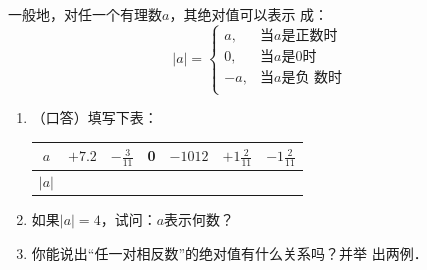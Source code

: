 一般地，对任一个有理数$a$，其绝对值可以表示
成：
\[|a|=\begin{cases}
a, & \text{当$a$是正数时}\\
0, & \text{当$a$是0时}\\
-a, & \text{当$a$是负 数时}\\
\end{cases}\]

\begin{ex}
	\begin{enumerate}
		\item （口答）填写下表：
		\begin{center}
			\begin{tabular}{c|cccccc}
				\hline
				$a$ & $+7.2$ & $-\frac{3}{11}$ & 0& $-1012$ &$+1\frac{2}{11}$ &$-1\frac{2}{11}$\\
				\hline
				$|a|$\\
				\hline
			\end{tabular}       
		\end{center}
		\item 如果$|a|=4$，试问：$a$表示何数？
		\item 你能说出“任一对相反数”的绝对值有什么关系吗？并举
		出两例．
	\end{enumerate}
\end{ex}


